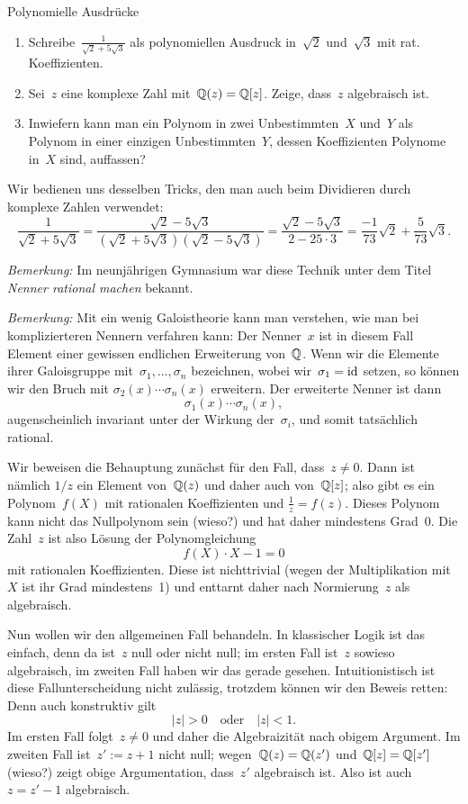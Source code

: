 \documentclass{algblatt}
\begin{document}
\begin{aufgabe}{Polynomielle Ausdrücke}
\begin{enumerate}
\item Schreibe~$\frac{1}{\sqrt{2} + 5\sqrt{3}}$ als polynomiellen Ausdruck
in~$\sqrt{2}$ und~$\sqrt{3}$ mit rat. Koeffizienten.
\item Sei~$z$ eine komplexe Zahl mit~$\mathbb{Q}(z) = \mathbb{Q}[z]$. Zeige, dass~$z$
algebraisch ist.
\item Inwiefern kann man ein Polynom in zwei Unbestimmten~$X$ und~$Y$ als
Polynom in einer einzigen Unbestimmten~$Y$, dessen Koeffizienten
Polynome in~$X$ sind, auffassen?
\end{enumerate}
\begin{loesungE}
\item Wir bedienen uns desselben Tricks, den man auch beim Dividieren durch
komplexe Zahlen verwendet:
\[ \frac{1}{\sqrt{2} + 5\sqrt{3}} =
  \frac{\sqrt{2} - 5\sqrt{3}}{(\sqrt{2} + 5\sqrt{3}) (\sqrt{2} - 5\sqrt{3})} =
  \frac{\sqrt{2} - 5\sqrt{3}}{2 - 25 \cdot 3} =
  \frac{-1}{73} \sqrt{2} + \frac{5}{73} \sqrt{3}. \]

\emph{Bemerkung:} Im neunjährigen Gymnasium war diese Technik unter dem Titel
\emph{Nenner rational machen} bekannt.

\emph{Bemerkung:} Mit ein wenig Galoistheorie kann man verstehen, wie man
bei komplizierteren Nennern verfahren kann: Der Nenner~$x$ ist in diesem Fall
Element einer gewissen endlichen Erweiterung von~$\mathbb{Q}$. Wenn wir die Elemente
ihrer Galoisgruppe mit~$\sigma_1, \ldots, \sigma_n$ bezeichnen, wobei
wir~$\sigma_1 = \mathrm{id}$ setzen, so können wir den Bruch mit $\sigma_2(x) \cdots
\sigma_n(x)$ erweitern. Der erweiterte Nenner ist dann
\[ \sigma_1(x) \cdots \sigma_n(x), \]
augenscheinlich invariant unter der Wirkung der~$\sigma_i$, und somit
tatsächlich rational.

\item Wir beweisen die Behauptung zunächst für den Fall, dass~$z \neq 0$. Dann
ist nämlich $1/z$ ein Element von~$\mathbb{Q}(z)$ und daher auch von~$\mathbb{Q}[z]$; also
gibt es ein Polynom~$f(X)$ mit rationalen Koeffizienten und
$\frac{1}{z} = f(z)$. Dieses Polynom kann nicht das Nullpolynom sein (wieso?)
und hat daher mindestens Grad~0. Die Zahl~$z$ ist also Lösung der
Polynomgleichung
\[ f(X) \cdot X - 1 = 0 \]
mit rationalen Koeffizienten. Diese ist nichttrivial (wegen der Multiplikation
mit~$X$ ist ihr Grad mindestens~1) und enttarnt daher nach Normierung~$z$ als
algebraisch.

Nun wollen wir den allgemeinen Fall behandeln. In klassischer Logik ist das
einfach, denn da ist~$z$ null oder nicht null; im ersten Fall ist~$z$ sowieso
algebraisch, im zweiten Fall haben wir das gerade gesehen. Intuitionistisch ist
diese Fallunterscheidung nicht zulässig, trotzdem können wir den Beweis retten:
Denn auch konstruktiv gilt
\[ |z| > 0 \quad\text{oder}\quad |z| < 1. \]
Im ersten Fall folgt~$z \neq 0$ und daher die Algebraizität nach obigem
Argument. Im zweiten Fall ist~$z' := z + 1$ nicht null; wegen~$\mathbb{Q}(z) =
\mathbb{Q}(z')$ und~$\mathbb{Q}[z] = \mathbb{Q}[z']$ (wieso?) zeigt obige Argumentation, dass~$z'$
algebraisch ist. Also ist auch~$z = z' - 1$ algebraisch.


\end{loesungE}
\end{aufgabe}
\end{document}
